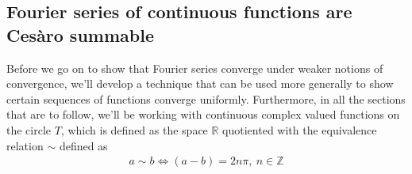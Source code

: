 \documentclass[12pt, titlepage]{article}
\theoremstyle{definition}
\begin{document}
\subsection{Fourier series of continuous functions are Cesàro summable}
Before we go on to show that Fourier series converge under weaker notions of convergence, we'll develop a technique that can be used more generally to show certain sequences of functions converge uniformly. Furthermore, in all the sections that are to follow, we'll be working with continuous complex valued functions on the circle $T$, which is defined as the space $\mathbb{R}$ quotiented with the equivalence relation $\sim$ defined as
\begin{align*}
    a \sim b \iff (a-b) = 2n\pi,\ n \in \mathbb{Z}
\end{align*}
\end{document}
